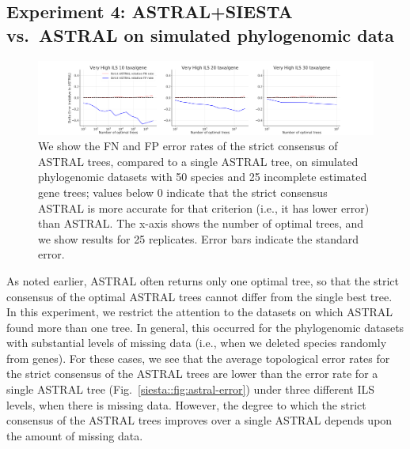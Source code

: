 \subsection{Experiment 4: ASTRAL+SIESTA vs.~ASTRAL on simulated phylogenomic data}





\begin{figure}[ht]
  \centering
 \includegraphics[width=.9\textwidth]{siesta-figs/astral-missing-ntrees}
    \caption[Change in topological error between ASTRAL and the SIESTA strict consensus of ASTRAL trees on simulated data, varying amount of missing data]{
We show the FN and FP error rates of the strict consensus of  ASTRAL trees, compared to a single ASTRAL tree,  on simulated phylogenomic datasets with 50 species and 25 incomplete estimated gene trees; values below 0 indicate that the strict consensus ASTRAL is more accurate for that criterion  (i.e., it has lower error) than ASTRAL. The x-axis shows the number of optimal trees, and 
 we show results for 25 replicates.
Error bars indicate the standard error.
  }
  \label{siesta::fig:astral-error-vs-number}
\end{figure}

As noted earlier, ASTRAL often returns only one optimal tree, so that the strict consensus of the optimal ASTRAL trees cannot differ from the single best tree. 
In this experiment, we restrict the attention to the datasets on which ASTRAL found more than one tree.
In general, this occurred for the phylogenomic datasets with substantial levels of missing data (i.e., when we deleted species randomly from genes). 
For these cases, we see that the average topological error rates  for the strict consensus of the ASTRAL trees  are lower than the error rate for a single ASTRAL tree (Fig.~\ref{siesta::fig:astral-error}) under three different ILS levels, when there is missing data. However, the degree to which the strict consensus of the ASTRAL  trees improves over a single ASTRAL depends upon the amount of missing data.

